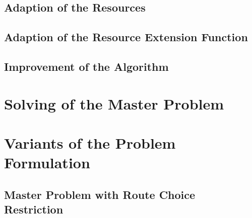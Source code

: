 
\subsection{Adaption of the Resources}


\subsection{Adaption of the Resource Extension Function}


\subsection{Improvement of the Algorithm}


\section{Solving of the Master Problem}
\label{sec:solving_masterproblem}


\section{Variants of the Problem Formulation}

\subsection{Master Problem with Route Choice Restriction}

